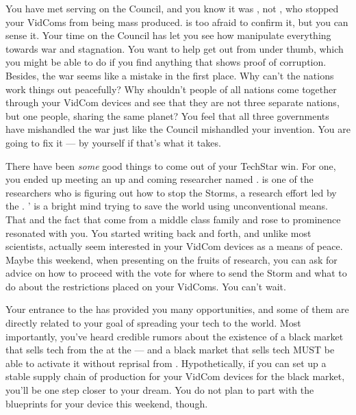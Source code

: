 \documentclass[char]{GL2020}
\begin{document}
You have met \cAntiChup{\them} serving on the Council, and you know it was \cAntiChup{\them}, not \cTechGod{}, who stopped your VidComs from being mass produced. \cScholarship{} is too afraid to confirm it, but you can sense it. Your time on the Council has let you see how \cAntiChup{\they} manipulate\cAntiChup{\verbs} everything towards war and stagnation. You want to help \cScholarship{} get out from under \cAntiChup{\their} thumb, which you might be able to do if you find anything that shows proof of \cAntiChup{\their} corruption. Besides, the war seems like a mistake in the first place. Why can't the nations work things out peacefully? Why shouldn't people of all nations come together through your VidCom devices and see that they are not three separate nations, but one people, sharing the same planet? You feel that all three governments have mishandled the war just like the Council mishandled your invention. You are going to fix it — by yourself if that's what it takes.

There have been \emph{some} good things to come out of your TechStar win. For one, you ended up meeting an up and coming researcher named \cAssistantScientist{\intro}. \cAssistantScientist{} is one of the researchers who is figuring out how to stop the Storms, a research effort led by the \pTech{}. \cAssistantScientist{}’ is a bright mind trying to save the world using unconventional means. That and the fact that \cAssistantScientist{\they} come\cAssistantScientist{\verbs} from a middle class family and rose to prominence resonated with you. You started writing back and forth, and unlike most scientists, \cAssistantScientist{\they} actually seem\cAssistantScientist{\verbs} interested in your VidCom devices as a means of peace. Maybe this weekend, when \cAssistantScientist{\theyare} presenting on the fruits of \cAssistantScientist{\their} research, you can ask for advice on how to proceed with the vote for where to send the Storm and what to do about the restrictions placed on your VidComs. You can’t wait. 

Your entrance to the \pSchool{} has provided you many opportunities, and some of them are directly related to your goal of spreading your tech to the world. Most importantly, you've heard credible rumors about the existence of a black market that sells tech from the \pTech{} at the \pSc{} — and a black market that sells tech MUST be able to activate it without reprisal from \cTechGod{}. Hypothetically, if you can set up a stable supply chain of production for your VidCom devices for the black market, you'll be one step closer to your dream. You do not plan to part with the blueprints for your device this weekend, though. 
\end{document}
